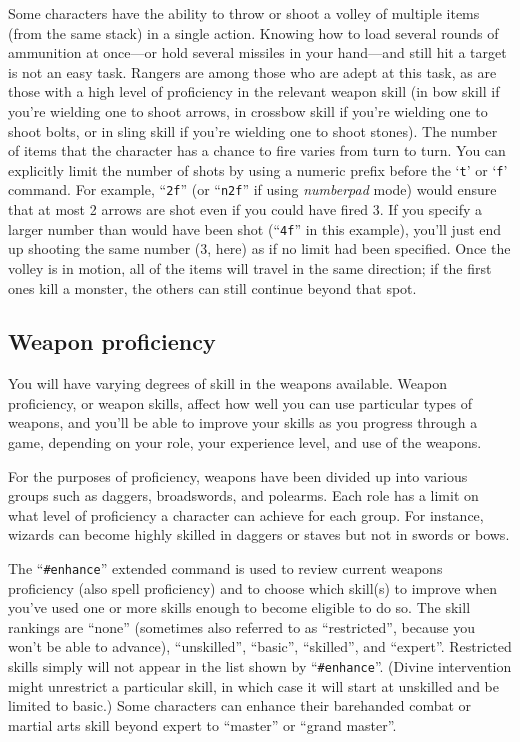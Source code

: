 \documentclass[titlepage]{article}
\begin{document}
Some characters have the ability to throw or shoot a volley of multiple
items (from the same stack) in a single action.
Knowing how to load several rounds of ammunition at
once---or hold several missiles in your hand---and
still hit a target is not an easy task.
Rangers are among those who are adept
at this task, as are those with a high level of proficiency in the
relevant weapon skill (in bow skill if you're wielding one to
shoot arrows, in crossbow skill if you're wielding one to shoot bolts,
or in sling skill if you're wielding one to shoot stones).
The number of items that the character has a chance to fire varies from
turn to turn.  You can explicitly limit the number of shots by using a
numeric prefix before the `\texttt{t}' or `\texttt{f}' command.
For example, ``\texttt{2f}'' (or ``\texttt{n2f}'' if using
\textit{number\textunderscore pad}
mode) would ensure that at most 2 arrows are shot
even if you could have fired 3.  If you specify
a larger number than would have been shot (``\texttt{4f}'' in this example),
you'll just end up shooting the same number (3, here) as if no limit
had been specified.  Once the volley is in motion, all of the items
will travel in the same direction; if the first ones kill a monster,
the others can still continue beyond that spot.

\subsection*{Weapon proficiency}

You will have varying degrees of skill in the weapons available.
Weapon proficiency, or weapon skills, affect how well you can use
particular types of weapons, and you'll be able to improve your skills
as you progress through a game, depending on your role, your experience
level, and use of the weapons.

For the purposes of proficiency, weapons have
been divided up into various groups such as daggers, broadswords, and
polearms.  Each role has a limit on what level of proficiency a character
can achieve for each group.  For instance, wizards can become highly
skilled in daggers or staves but not in swords or bows.

The ``\texttt{\#enhance}'' extended command is used to review current weapons
proficiency
(also spell proficiency) and to choose which skill(s) to improve when
you've used one or more skills enough to become eligible to do so.  The
skill rankings are ``none'' (sometimes also referred to as ``restricted'',
because you won't be able to advance), ``unskilled'', ``basic'', ``skilled'',
and ``expert''.  Restricted skills simply will not appear in the list
shown by ``\texttt{\#enhance}''.
(Divine intervention might unrestrict a particular
skill, in which case it will start at unskilled and be limited to basic.)
Some characters can enhance their barehanded combat or martial arts skill
beyond expert to ``master'' or ``grand master''.
\end{document}
